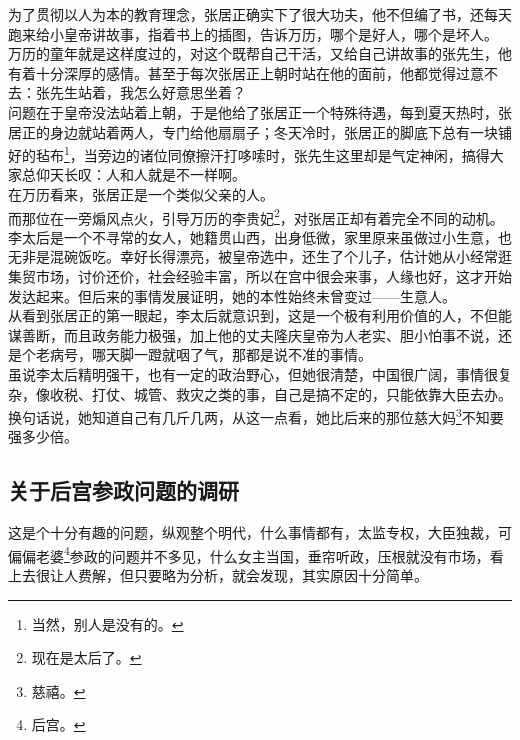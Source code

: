 \begin{multicols}{\theparacolNo}
为了贯彻以人为本的教育理念，张居正确实下了很大功夫，他不但编了书，还每天跑来给小皇帝讲故事，指着书上的插图，告诉万历，哪个是好人，哪个是坏人。\\

万历的童年就是这样度过的，对这个既帮自己干活，又给自己讲故事的张先生，他有着十分深厚的感情。甚至于每次张居正上朝时站在他的面前，他都觉得过意不去：张先生站着，我怎么好意思坐着？\\

问题在于皇帝没法站着上朝，于是他给了张居正一个特殊待遇，每到夏天热时，张居正的身边就站着两人，专门给他扇扇子；冬天冷时，张居正的脚底下总有一块铺好的毡布\footnote{当然，别人是没有的。}，当旁边的诸位同僚擦汗打哆嗦时，张先生这里却是气定神闲，搞得大家总仰天长叹：人和人就是不一样啊。\\

在万历看来，张居正是一个类似父亲的人。\\

而那位在一旁煽风点火，引导万历的李贵妃\footnote{现在是太后了。}，对张居正却有着完全不同的动机。\\

李太后是一个不寻常的女人，她籍贯山西，出身低微，家里原来虽做过小生意，也无非是混碗饭吃。幸好长得漂亮，被皇帝选中，还生了个儿子，估计她从小经常逛集贸市场，讨价还价，社会经验丰富，所以在宫中很会来事，人缘也好，这才开始发达起来。但后来的事情发展证明，她的本性始终未曾变过——生意人。\\

从看到张居正的第一眼起，李太后就意识到，这是一个极有利用价值的人，不但能谋善断，而且政务能力极强，加上他的丈夫隆庆皇帝为人老实、胆小怕事不说，还是个老病号，哪天脚一蹬就咽了气，那都是说不准的事情。\\

虽说李太后精明强干，也有一定的政治野心，但她很清楚，中国很广阔，事情很复杂，像收税、打仗、城管、救灾之类的事，自己是搞不定的，只能依靠大臣去办。换句话说，她知道自己有几斤几两，从这一点看，她比后来的那位慈大妈\footnote{慈禧。}不知要强多少倍。\\

\subsection{关于后宫参政问题的调研}
这是个十分有趣的问题，纵观整个明代，什么事情都有，太监专权，大臣独裁，可偏偏老婆\footnote{后宫。}参政的问题并不多见，什么女主当国，垂帘听政，压根就没有市场，看上去很让人费解，但只要略为分析，就会发现，其实原因十分简单。\\


\end{multicols}
